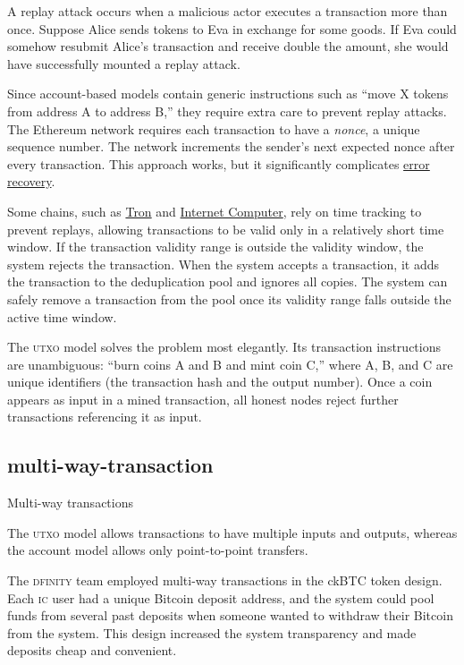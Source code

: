 \documentclass{article}
\begin{document}
A replay attack occurs when a malicious actor executes a transaction more than once.
Suppose Alice sends tokens to Eva in exchange for some goods.
If Eva could somehow resubmit Alice's transaction and receive double the amount,
she would have successfully mounted a replay attack.

Since account-based models contain generic instructions such as ``move X tokens from address A to address B,''
they require extra care to prevent replay attacks.
The Ethereum network requires each transaction to have a \emph{nonce}, a unique sequence number.
The network increments the sender's next expected nonce after every transaction.
This approach works, but it significantly complicates \href{#error-recovery}{error recovery}.

Some chains, such as \href{https://tron.network/}{Tron} and \href{https://internetcomputer.org/}{Internet Computer}, rely on time tracking to prevent replays,
allowing transactions to be valid only in a relatively short time window.
If the transaction validity range is outside the validity window, the system rejects the transaction.
When the system accepts a transaction, it adds the transaction to the deduplication pool and ignores all copies.
The system can safely remove a transaction from the pool once its validity range falls outside the active time window.

The \textsc{utxo} model solves the problem most elegantly.
Its transaction instructions are unambiguous: ``burn coins A and B and mint coin C,''
where A, B, and C are unique identifiers (the transaction hash and the output number).
Once a coin appears as input in a mined transaction,
all honest nodes reject further transactions referencing it as input.

\subsection{multi-way-transaction}{Multi-way transactions}

The \textsc{utxo} model allows transactions to have multiple inputs and outputs,
whereas the account model allows only point-to-point transfers.

The \textsc{dfinity} team employed multi-way transactions in the ckBTC token design.
Each \textsc{ic} user had a unique Bitcoin deposit address,
and the system could pool funds from several past deposits when someone wanted to withdraw their Bitcoin from the system.
This design increased the system transparency and made deposits cheap and convenient.
\end{document}

